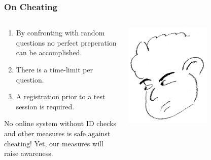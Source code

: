 \begin{frame}
  \frametitle{On Cheating}
  \begin{columns}
   \begin{column}{.5\textwidth}
     \begin{enumerate}
      \item By confronting with random questions no perfect preperation can be accomplished.
      \item There is a time-limit per question.
      \item A registration prior to a test session is required.
     \end{enumerate}
    No online system without ID checks and other measures is safe against cheating! Yet, our measures will raise awareness.
   \end{column}
   \begin{column}{.5\textwidth}
       \centering
      \includegraphics[width=0.6\textwidth]{images/cheating}
    \end{column}
  \end{columns}
\end{frame}

